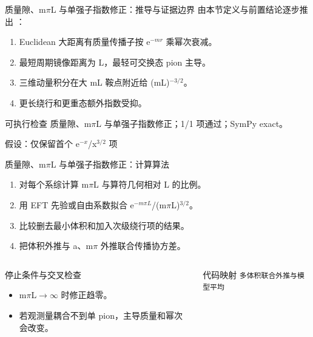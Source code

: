 \begin{frame}[t]{质量隙、m\ensuremath{\pi}L 与单强子指数修正：推导与证据边界}
\footnotesize
{}\quad 由本节定义与前置结论逐步推出 ：
\begin{enumerate}
\item Euclidean 大距离有质量传播子按 e\ensuremath{^{-m r}} 乘幂次衰减。
\item 最短周期镜像距离为 L，最轻可交换态 pion 主导。
\item 三维动量积分在大 mL 鞍点附近给 (mL)\ensuremath{^{-3/2}}。
\item 更长绕行和更重态额外指数受抑。
\end{enumerate}\begin{block}{可执行检查}
\quad 质量隙、m\ensuremath{\pi}L 与单强子指数修正；1/1 项通过；SymPy exact。
\par\scriptsize 假设：仅保留首个 e\ensuremath{^{-x}}/\allowbreak{}x\ensuremath{^{3/2}} 项
\end{block}
\end{frame}

\begin{frame}[t]{质量隙、m\ensuremath{\pi}L 与单强子指数修正：计算算法}
\footnotesize
{}\begin{enumerate}
\item 对每个系综计算 m\ensuremath{\pi}L 与算符几何相对 L 的比例。
\item 用 EFT 先验或自由系数拟合 e\ensuremath{^{-m\pi{}L}}/\allowbreak{}(m\ensuremath{\pi}L)\ensuremath{^{3/2}}。
\item 比较删去最小体积和加入次级绕行项的结果。
\item 把体积外推与 a、m\ensuremath{\pi} 外推联合传播协方差。
\end{enumerate}\begin{columns}[T,onlytextwidth]
\begin{block}{停止条件与交叉检查}\scriptsize\begin{itemize}
\item[\CheckMark] m\ensuremath{\pi}L\ensuremath{\rightarrow}\ensuremath{\infty} 时修正趋零。
\item[\CheckMark] 若观测量耦合不到单 pion，主导质量和幂次会改变。
\end{itemize}\end{block}
\begin{block}{代码映射}
\scriptsize \texttt{多体积联合外推与模型平均}
\end{block}\end{columns}\end{frame}

